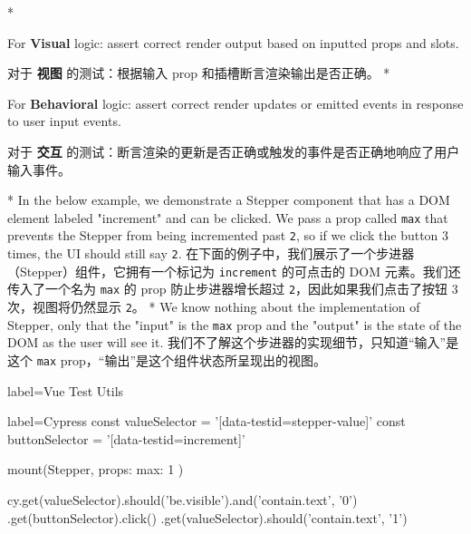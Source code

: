 \begin{itemize}
\begin{paracol}{2}
\switchcolumn[0]*%
\item
    For \textbf{Visual} logic: assert correct render output based on
    inputted props and slots.
\switchcolumn
    \item
    对于 \textbf{视图} 的测试：根据输入 prop
    和插槽断言渲染输出是否正确。
\switchcolumn[0]*%
\item
    For \textbf{Behavioral} logic: assert correct render updates or
    emitted events in response to user input events.
\switchcolumn
    \item
    对于 \textbf{交互}
    的测试：断言渲染的更新是否正确或触发的事件是否正确地响应了用户输入事件。
\end{paracol}
\end{itemize}    


\begin{paracol}{2}
\switchcolumn[0]*%
In the below example, we demonstrate a Stepper component that has a
DOM element labeled "increment" and can be clicked. We pass a prop
called \texttt{max} that prevents the Stepper from being incremented
past \texttt{2}, so if we click the button 3 times, the UI should
still say \texttt{2}.
\switchcolumn
在下面的例子中，我们展示了一个步进器（Stepper）组件，它拥有一个标记为
\texttt{increment} 的可点击的 DOM 元素。我们还传入了一个名为
\texttt{max} 的 prop 防止步进器增长超过
\texttt{2}，因此如果我们点击了按钮 3 次，视图将仍然显示 \texttt{2}。
\switchcolumn[0]*%
We know nothing about the implementation of Stepper, only that the
"input" is the \texttt{max} prop and the "output" is the state of the
DOM as the user will see it.
\switchcolumn
我们不了解这个步进器的实现细节，只知道``输入''是这个 \texttt{max}
prop，``输出''是这个组件状态所呈现出的视图。
\end{paracol}

\begin{codeJs*}{label={Vue Test Utils}}

\end{codeJs*}    

\begin{codeJs*}{label={Cypress}}
const valueSelector = '[data-testid=stepper-value]'
const buttonSelector = '[data-testid=increment]'

mount(Stepper, {
    props: {
    max: 1
    }
})

cy.get(valueSelector).should('be.visible').and('contain.text', '0')
    .get(buttonSelector).click()
    .get(valueSelector).should('contain.text', '1')
\end{codeJs*}    

